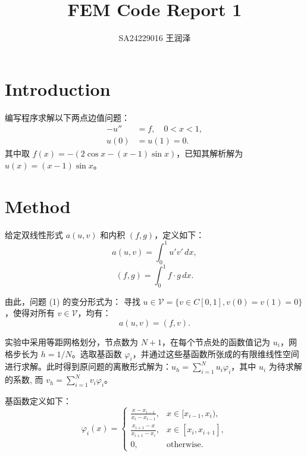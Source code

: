 \documentclass[11pt]{ctexart}
\title{FEM Code Report 1}
\author{SA24229016 王润泽}
\begin{document}
\maketitle

\section{Introduction}
	编写程序求解以下两点边值问题：
	\begin{equation}
		\begin{aligned}
			-u'' &= f, \quad 0 < x < 1, \\
			u(0) &= u(1) = 0.
		\end{aligned}
	\end{equation}
	其中取 $ f(x) = -(2\cos{x}-(x-1)\sin{x}) $，已知其解析解为 $ u(x) = (x-1)\sin{x} $。
\section{Method}

	给定双线性形式 $a(u,v)$ 和内积 $(f, g)$，定义如下：
	\begin{equation}
		a(u,v) = \int_0^1 u' v' \, dx,
		\label{eq:double_linear}
	\end{equation}
	\begin{equation}
		(f, g) = \int_0^1 f \cdot g \, dx.
		\label{eq:inner_product}
	\end{equation}

	由此，问题 (1) 的变分形式为：  
	寻找 $u \in \mathcal{V} = \{v \in C[0,1], v(0) = v(1) = 0\}$，使得对所有 $v \in \mathcal{V} $，均有：
	\begin{equation}
		a(u,v) = (f,v).
	\end{equation}

	实验中采用等距网格划分，节点数为 $N+1$，在每个节点处的函数值记为 $u_i$，网格步长为 $h = 1/N$。选取基函数 $\varphi_i$，并通过这些基函数所张成的有限维线性空间进行求解。此时得到原问题的离散形式解为：$ u_h = \sum_{i=1}^{N} u_i \varphi_i $，其中 $u_i$ 为待求解的系数, 而 $ v_h = \sum_{i=1}^{N} v_i \varphi_i $。 
	
	基函数定义如下：
	\begin{equation}
		\varphi_i(x) = 
		\begin{cases} 
		\frac{x - x_{i-1}}{x_i - x_{i-1}}, & x \in [x_{i-1}, x_i), \\
		\frac{x_{i+1} - x}{x_{i+1} - x_i}, & x \in [x_i, x_{i+1}], \\
		0, & \text{otherwise}.
		\end{cases}
	\end{equation}
\end{document}
